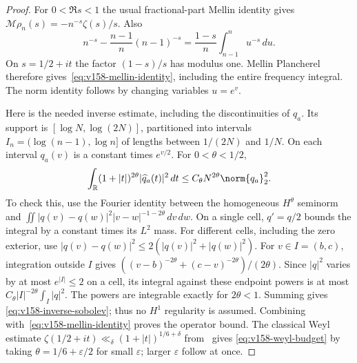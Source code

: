 \begin{proof}
For $0<\Re s<1$ the usual fractional-part Mellin identity gives
$\mathcal M\rho_n(s)=-n^{-s}\zeta(s)/s$. Also
\[
 n^{-s}-\frac{n-1}{n}(n-1)^{-s}
 =\frac{1-s}{n}\int_{n-1}^n u^{-s}\,du.
\]
On $s=1/2+it$ the factor $(1-s)/s$ has modulus one. Mellin Plancherel
therefore gives~\eqref{eq:v158-mellin-identity}, including the entire
frequency integral. The norm identity follows by changing variables
$u=e^v$.

Here is the needed inverse estimate, including the discontinuities of
$q_a$. Its support is $[\log N,\log(2N)]$, partitioned into intervals
$I_n=(\log(n-1),\log n]$ of lengths between $1/(2N)$ and $1/N$.
On each interval $q_a(v)$ is a constant times $e^{v/2}$. For
$0<\theta<1/2$,
\begin{equation}
 \int_{\mathbb R}(1+|t|)^{2\theta}|\widehat q_a(t)|^2\,dt
 \leq C_\theta N^{2\theta}\norm{q_a}_2^2.
 \label{eq:v158-inverse-sobolev}
\end{equation}
To check this, use the Fourier identity between the homogeneous
$H^\theta$ seminorm and
$\iint |q(v)-q(w)|^2|v-w|^{-1-2\theta}\,dv\,dw$.
On a single cell, $q'=q/2$ bounds the integral by a constant times its
$L^2$ mass. For different cells, including the zero exterior, use
$|q(v)-q(w)|^2\leq2(|q(v)|^2+|q(w)|^2)$.
For $v\in I=(b,c)$, integration outside $I$ gives
$((v-b)^{-2\theta}+(c-v)^{-2\theta})/(2\theta)$.
Since $|q|^2$ varies by at most $e^{|I|}\leq2$ on a cell, its integral
against these endpoint powers is at most
$C_\theta |I|^{-2\theta}\int_I|q|^2$.
The powers are integrable exactly for $2\theta<1$. Summing gives
\eqref{eq:v158-inverse-sobolev}; thus no $H^1$ regularity is assumed.
Combining with~\eqref{eq:v158-mellin-identity} proves the operator bound.
The classical Weyl estimate
$\zeta(1/2+it)\ll_\delta(1+|t|)^{1/6+\delta}$
from~\cite[Section 2]{HuxleyIvic2007} gives
\eqref{eq:v158-weyl-budget} by taking $\theta=1/6+\varepsilon/2$
for small $\varepsilon$; larger $\varepsilon$ follow at once.
\end{proof}

